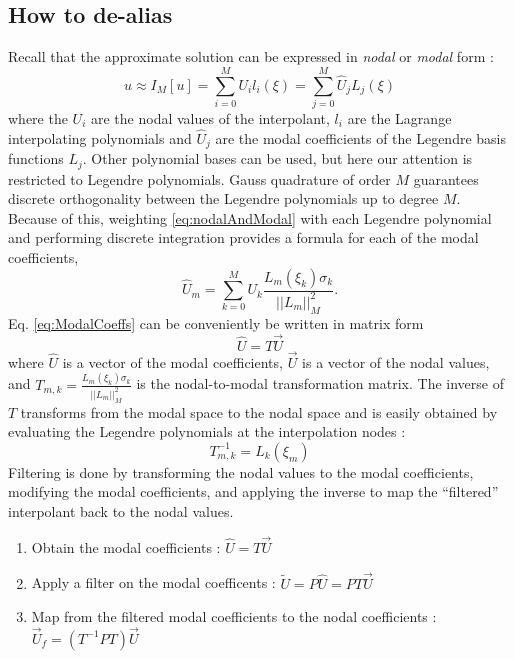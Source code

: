 \documentclass[12pt]{softwaremanual}
\begin{document}
\subsection{How to de-alias}
Recall that the approximate solution can be expressed in \textit{nodal} or \textit{modal} form :
\begin{equation}
u \approx I_M[u] = \sum_{i=0}^M U_i l_i(\xi) = \sum_{j=0}^{M} \hat{U}_j L_j(\xi) \label{eq:nodalAndModal}
\end{equation}
where the $U_i$ are the nodal values of the interpolant, $l_i$ are the Lagrange interpolating polynomials and $\hat{U}_j$ are the modal coefficients of the Legendre basis functions $L_j$. Other polynomial bases can be used, but here our attention is restricted to Legendre polynomials. Gauss quadrature of order $M$ guarantees discrete orthogonality between the Legendre polynomials up to degree $M$. Because of this, weighting \eqref{eq:nodalAndModal} with each Legendre polynomial and performing discrete integration provides a formula for each of the modal coefficients,
\begin{equation}
\hat{U}_m = \sum_{k=0}^M U_k \frac{L_m(\xi_k) \sigma_k}{||L_m||^2_M} \label{eq:ModalCoeffs}.
\end{equation}
Eq. \eqref{eq:ModalCoeffs} can be conveniently be written in matrix form
\begin{equation}
\hat{U} = T \vec{U}
\end{equation}
where $\hat{U}$ is a vector of the modal coefficients, $\vec{U}$ is a vector of the nodal values, and $T_{m,k} = \frac{L_m(\xi_k) \sigma_k}{||L_m||^2_M} $ is the nodal-to-modal transformation matrix. The inverse of $T$ transforms from the modal space to the nodal space and is easily obtained by evaluating the Legendre polynomials at the interpolation nodes :
\begin{equation}
T^{-1}_{m,k} = L_{k}(\xi_m) \label{eq:ModalToNodal}
\end{equation}
Filtering is done by transforming the nodal values to the modal coefficients, modifying the modal coefficients, and applying the inverse to map the ``filtered'' interpolant back to the nodal values.
\begin{enumerate}
\item Obtain the modal coefficients : $\hat{U} = T \vec{U}$ 
\item Apply a filter on the modal coefficents : $\tilde{U} = P\hat{U} = PT\vec{U}$
\item Map from the filtered modal coefficients to the nodal coefficients : $\vec{U}_{f} = (T^{-1}PT)\vec{U}$
\end{enumerate}
\end{document}
